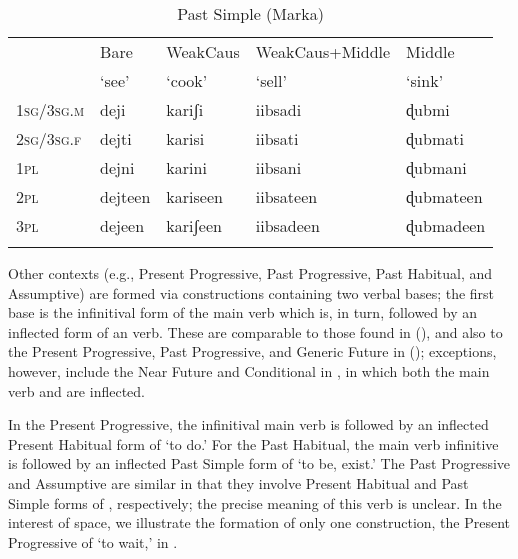 \documentclass[output=paper,modfonts,nonflat,
colorlinks, citecolor=brown,
draftmode
]{langsci/langscibook}
\begin{document}
 \begin{table}
 	\caption{{Past Simple (Marka)}}
 	\label{tab:1:Past Simple}
 	\begin{tabularx}{\textwidth}{Xllll} 
 		\lsptoprule
 		& Bare   & WeakCaus  & WeakCaus+Middle & Middle   \\
 		& `see' & `cook' & `sell' & `sink' \\ 
 		\midrule
 		1\textsc{sg}/3\textsc{sg.m} & deji & kariʃi & iibsadi & ɖubmi \\
 		2\textsc{sg}/3\textsc{sg.f} & dejti  & karisi & iibsati  & ɖubmati  \\
 		1\textsc{pl} & dejni & karini & iibsani & ɖubmani \\
 		2\textsc{pl} & dejteen & kariseen & iibsateen & ɖubmateen \\
 		3\textsc{pl} & dejeen & kariʃeen & iibsadeen & ɖubmadeen \\
 		\lspbottomrule
 	\end{tabularx}
 \end{table}
 
 Other contexts (e.g., Present Progressive, Past Progressive, Past Habitual, and Assumptive) are formed via  constructions containing two verbal bases; the first base is the infinitival form of the main verb which is, in turn, followed by an inflected form of an  verb. These are comparable to those found in  (\citealt{Greenetal2015}), and also to the Present Progressive, Past Progressive, and Generic Future in  (\citealt{PasterRanero2015}); exceptions, however, include the Near Future and Conditional in , in which both the main verb and  are inflected.
 
 In the  Present Progressive, the infinitival main verb is followed by an inflected Present Habitual form of  `to do.' For the Past Habitual, the main verb infinitive is followed by an inflected Past Simple form of  `to be, exist.' The Past Progressive and Assumptive are similar in that they involve Present Habitual and Past Simple forms of , respectively; the precise meaning of this verb is unclear. In the interest of space, we illustrate the formation of only one  construction, the Present Progressive of  `to wait,' in . 
 
\end{document}

